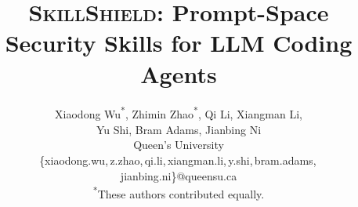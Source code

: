 \documentclass[letterpaper,twocolumn,10pt]{article}
\theoremstyle{definition}
\newcommand{\sysname}{\textsc{SkillShield}\xspace}
\begin{document}

\date{}

\title{\Large \bf \sysname: Prompt-Space Security Skills for LLM Coding Agents}

\author{
  {\rm Xiaodong Wu\textsuperscript{*}, \quad Zhimin Zhao\textsuperscript{*}, \quad Qi Li, \quad Xiangman Li,}\\[2pt]
  {\rm Yu Shi, \quad Bram Adams, \quad Jianbing Ni}\\[3pt]
  {\rm Queen's University}\\[2pt]
  {\rm \{xiaodong.wu,\,z.zhao,\,qi.li,\,xiangman.li,\,y.shi,\,bram.adams,\,jianbing.ni\}@queensu.ca}\\[4pt]
  {\rm \textsuperscript{*}These authors contributed equally.}
}

\maketitle












\cleardoublepage
\appendix






\appendix


\end{document}
